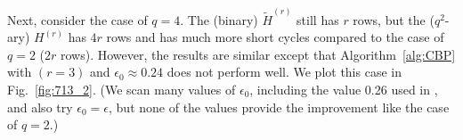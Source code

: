 \documentclass{ieeeaccess}
\theoremstyle{definition}		%
\begin{document}
Next, consider the case of $q=4$. 
The (binary) $\tilde H^{(r)}$ still has $r$ rows, but the ($q^2$-ary) $H^{(r)}$ has $4r$ rows
and has much more short cycles compared to the case of $q=2$ ($2r$ rows).
However, the results are similar except that Algorithm~\ref{alg:CBP} with $(r=3)$ and $\epsilon_0 \approx 0.24$ does not perform well.
We plot this case in Fig.~\ref{fig:713_2}.
%
(We scan many values of $\epsilon_0$, including the value 0.26 used in \cite{Bab+15}, and also try $\epsilon_0=\epsilon$, 
but none of the values provide the improvement like the case of $q=2$.)
 
















\ifCLASSOPTIONcaptionsoff		%
\newpage						%
\fi								%

%
\end{document}
